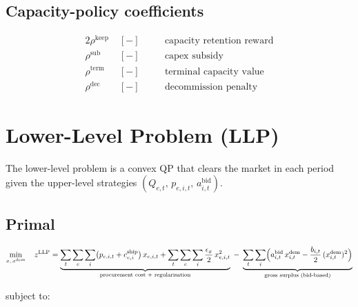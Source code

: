 \documentclass[11pt]{article}
\begin{document}
\subsection*{Capacity-policy coefficients}

\begin{alignat*}{2}
  \rho^{\mathrm{keep}} &\;[-]
    &&\quad\text{capacity retention reward}      \\
  \rho^{\mathrm{sub}}  &\;[-]
    &&\quad\text{capex subsidy}                  \\
  \rho^{\mathrm{term}} &\;[-]
    &&\quad\text{terminal capacity value}        \\
  \rho^{\mathrm{dec}}  &\;[-]
    &&\quad\text{decommission penalty}
\end{alignat*}

\section{Lower-Level Problem (LLP)}

The lower-level problem is a convex QP that clears the market in each
period given the upper-level strategies
$(Q_{e,t},\,p_{e,i,t},\,a^{\mathrm{bid}}_{i,t})$.

\subsection{Primal}

\begin{equation}\label{eq:llp-obj}
\min_{x,\,x^{\mathrm{dem}}} \quad
z^{\mathrm{LLP}}
= \underbrace{
    \sum_{t}\sum_{e}\sum_{i}
    \bigl(p_{e,i,t}+c^{\mathrm{ship}}_{e,i}\bigr)\,x_{e,i,t}
    + \sum_{t}\sum_{e}\sum_{i}
    \frac{\epsilon_x}{2}\,x_{e,i,t}^{2}
  }_{\text{procurement cost + regularisation}}
  \;-\;
  \underbrace{
    \sum_{t}\sum_{i}
    \Bigl(
      a^{\mathrm{bid}}_{i,t}\,x^{\mathrm{dem}}_{i,t}
      - \frac{b_{i,t}}{2}\,(x^{\mathrm{dem}}_{i,t})^{2}
    \Bigr)
  }_{\text{gross surplus (bid-based)}}
\end{equation}

subject to:
\end{document}
